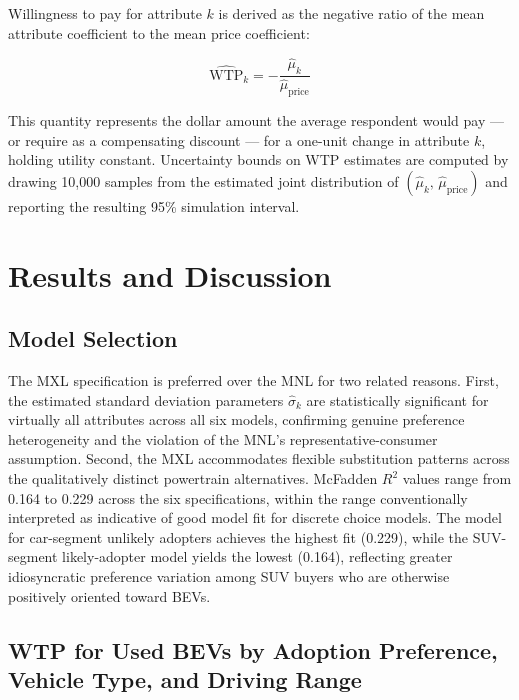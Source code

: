 \documentclass[a4paper,fleqn]{cas-sc}   %
\begin{document}
Willingness to pay for attribute $k$ is derived as the negative ratio of the mean attribute coefficient to the mean price coefficient:

\begin{equation}
\widehat{\text{WTP}}_k = -\frac{\hat{\mu}_k}{\hat{\mu}_{\text{price}}}
\label{eq:wtp}
\end{equation}

\noindent This quantity represents the dollar amount the average respondent would pay --- or require as a compensating discount --- for a one-unit change in attribute $k$, holding utility constant. Uncertainty bounds on WTP estimates are computed by drawing 10{,}000 samples from the estimated joint distribution of $(\hat{\mu}_k,\, \hat{\mu}_{\text{price}})$ and reporting the resulting 95\% simulation interval.

\section{Results and Discussion}

\subsection{Model Selection}
\label{subsec:model_selection}

The MXL specification is preferred over the MNL for two related reasons. First, the estimated standard deviation parameters $\hat{\sigma}_k$ are statistically significant for virtually all attributes across all six models, confirming genuine preference heterogeneity and the violation of the MNL's representative-consumer assumption. Second, the MXL accommodates flexible substitution patterns across the qualitatively distinct powertrain alternatives. McFadden $R^2$ values range from 0.164 to 0.229 across the six specifications, within the range conventionally interpreted as indicative of good model fit for discrete choice models. The model for car-segment unlikely adopters achieves the highest fit (0.229), while the SUV-segment likely-adopter model yields the lowest (0.164), reflecting greater idiosyncratic preference variation among SUV buyers who are otherwise positively oriented toward BEVs.

\subsection{WTP for Used BEVs by Adoption Preference, Vehicle Type, and Driving Range}
\label{subsec:wtp_range}
\end{document}
